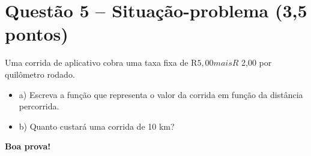 \documentclass[12pt]{article}
\begin{document}
\vspace{2cm}

\section*{Questão 5 – Situação-problema (3,5 pontos)}
Uma corrida de aplicativo cobra uma taxa fixa de R$ 5,00 mais R$ 2,00 por quilômetro rodado.

\begin{itemize}
\item a) Escreva a função que representa o valor da corrida em função da distância percorrida.
\item b) Quanto custará uma corrida de 10 km?
\end{itemize}

\vspace{2cm}

\begin{center}
\textbf{Boa prova!}
\end{center}
\end{document}
